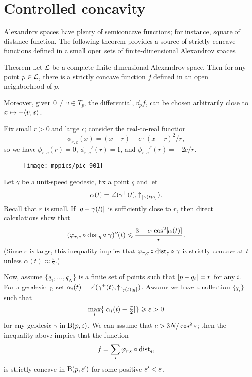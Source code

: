 \section{Controlled concavity}

Alexandrov spaces have plenty of semiconcave functions;
for instance, square of distance function. 
The following theorem provides a source of strictly concave functions  defined in a small open sets of finite-dimensional Alexandrov spaces. 

\begin{thm}{Theorem}
\label{thm:strictly-concave}
Let $\mathcal{L}$ be a complete finite-dimensional Alexandrov  space.
Then for any point $p\in \mathcal{L}$, there is  a strictly concave function $f$ defined in an
open neighborhood of $p$.

Moreover, given $0\ne v\in T_p$, the differential, $\dd_p f$, can be chosen
arbitrarily close to $x\mapsto -\langle v,x\rangle$.
\end{thm}

Fix small $r>0$ and large $c$;
consider the real-to-real function 
$$\phi_{r,c}(x)=(x-r)- c\cdot(x-r)^2/r,$$
so we have 
$\phi_{r,c}(r)=0$,
$\phi_{r,c}'(r)=1$,
and $\phi_{r,c}''(r)=- {2c}/{r}$. 

\begin{wrapfigure}{o}{44 mm}
\vskip-0mm
\centering
\texttt{[image: mppics/pic-901]}
\vskip1mm
\end{wrapfigure}

Let $\gamma$ be a unit-speed geodesic, fix a point $q$ and let 
$$\alpha(t)=\measuredangle(\gamma^+(t),{\uparrow}_{[{\gamma(t)}{q}]_{{}}}).$$
Recall that $r$ is small.
If $|{q}-{\gamma(t)}|_{}^{{}}$ is sufficiently close to
$r$, then direct calculations show that
$$(\phi_{r,c}\circ\distfun_q\circ\gamma)''(t)
\le 
\frac{3-c\cdot \cos^2[\alpha(t)]}{r}.$$
(Since $c$ is large, this inequality implies that $\varphi_{r,c}\circ\mathrm{dist}_q\circ\gamma$ is strictly concave at $t$ unless $\alpha(t)\approx\tfrac\pi2$.) 

Now, assume $\{q_1,\dots, q_N\}$ is a finite set of points such that $|{p}-{q_i}|_{}^{{}}=r$ for any $i$. 
For a geodesic $\gamma$, set $\alpha_i(t)=\measuredangle(\gamma^+(t),{\uparrow}_{[{\gamma(t)}{q_i}]_{{}}})$. 
Assume we have a collection $\{q_i\}$ such
that 
\[\max_i\{|\alpha_i(t)-\tfrac\pi2|\}\geqslant\varepsilon>0\]
for any geodesic $\gamma$ in $\mathrm{B}{}(p,\varepsilon)$. 
We can assume that $c>3N/\cos^2\varepsilon$;
then the inequality above implies that the function
$$f=\sum_i \varphi_{r,c}\circ\mathrm{dist}_{q_i}$$
is strictly concave in $\mathrm{B}{}(p,\varepsilon')$ for some positive $\varepsilon'<\varepsilon$.

